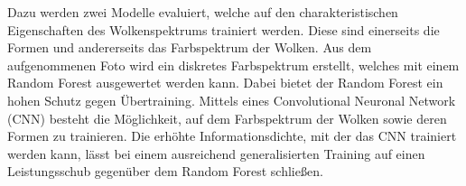 Dazu werden zwei Modelle evaluiert, welche auf den charakteristischen
Eigenschaften des Wolkenspektrums trainiert werden. 
Diese sind einerseits die Formen und andererseits das Farbspektrum der Wolken.
Aus dem aufgenommenen Foto wird ein diskretes Farbspektrum erstellt, welches 
mit einem Random Forest ausgewertet werden kann.
Dabei bietet der Random Forest ein hohen Schutz gegen Übertraining.
Mittels eines Convolutional Neuronal Network (CNN) besteht die Möglichkeit, auf
dem Farbspektrum der Wolken sowie deren Formen zu trainieren. 
Die erhöhte Informationsdichte, mit der das CNN trainiert werden kann, 
lässt bei einem ausreichend generalisierten Training auf einen Leistungsschub
gegenüber dem Random Forest schließen.


